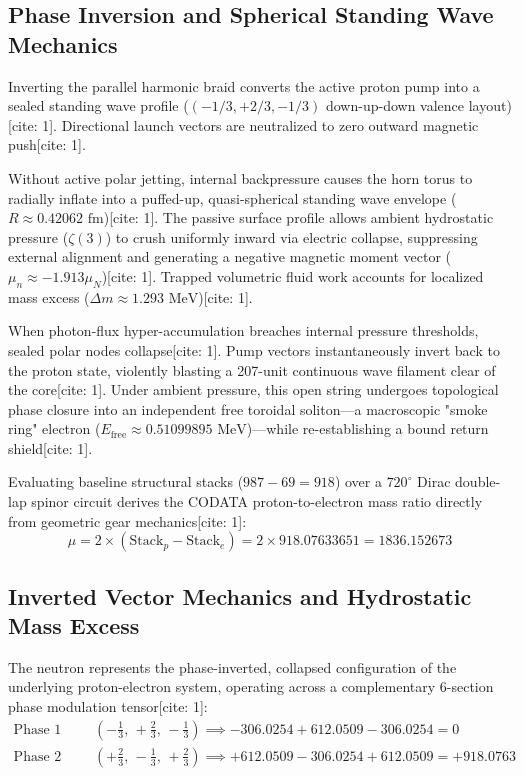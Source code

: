 \documentclass[11pt,a4paper]{article}
\begin{document}
	\subsection{Phase Inversion and Spherical Standing Wave Mechanics}
	Inverting the parallel harmonic braid converts the active proton pump into a sealed standing wave profile ($(-1/3, +2/3, -1/3)$ down-up-down valence layout)[cite: 1]. Directional launch vectors are neutralized to zero outward magnetic push[cite: 1].
	
	Without active polar jetting, internal backpressure causes the horn torus to radially inflate into a puffed-up, quasi-spherical standing wave envelope ($R \approx 0.42062\text{ fm}$)[cite: 1]. The passive surface profile allows ambient hydrostatic pressure ($\zeta(3)$) to crush uniformly inward via electric collapse, suppressing external alignment and generating a negative magnetic moment vector ($\mu_n \approx -1.913 \mu_N$)[cite: 1]. Trapped volumetric fluid work accounts for localized mass excess ($\Delta m \approx 1.293\text{ MeV}$)[cite: 1].
	
	When photon-flux hyper-accumulation breaches internal pressure thresholds, sealed polar nodes collapse[cite: 1]. Pump vectors instantaneously invert back to the proton state, violently blasting a 207-unit continuous wave filament clear of the core[cite: 1]. Under ambient pressure, this open string undergoes topological phase closure into an independent free toroidal soliton—a macroscopic "smoke ring" electron ($E_{\text{free}} \approx 0.51099895\text{ MeV}$)—while re-establishing a bound return shield[cite: 1].
	
	Evaluating baseline structural stacks ($987 - 69 = 918$) over a $720^\circ$ Dirac double-lap spinor circuit derives the CODATA proton-to-electron mass ratio directly from geometric gear mechanics[cite: 1]:
	\begin{equation}
		\mu = 2 \times (\text{Stack}_p - \text{Stack}_e) = 2 \times 918.07633651 = 1836.152673
	\end{equation}
	
	\subsection{Inverted Vector Mechanics and Hydrostatic Mass Excess}
	The neutron represents the phase-inverted, collapsed configuration of the underlying proton-electron system, operating across a complementary 6-section phase modulation tensor[cite: 1]:
	\begin{align}
		\text{Phase 1 (Sections 1--3):} & \quad \left(-\frac{1}{3}, \, +\frac{2}{3}, \, -\frac{1}{3}\right) \implies -306.0254 + 612.0509 - 306.0254 = 0 \\
		\text{Phase 2 (Sections 4--6):} & \quad \left(+\frac{2}{3}, \, -\frac{1}{3}, \, +\frac{2}{3}\right) \implies +612.0509 - 306.0254 + 612.0509 = +918.0763
	\end{align}
	
\end{document}
